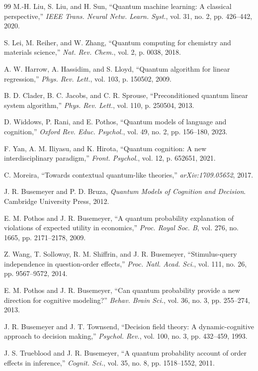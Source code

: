 \documentclass[journal]{IEEEtran}
\begin{document}
\begin{thebibliography}{99}
 M.-H. Liu, S. Liu, and H. Sun, ``Quantum machine learning: A classical perspective,'' \textit{IEEE Trans. Neural Netw. Learn. Syst.}, vol. 31, no. 2, pp. 426--442, 2020.

 S. Lei, M. Reiher, and W. Zhang, ``Quantum computing for chemistry and materials science,'' \textit{Nat. Rev. Chem.}, vol. 2, p. 0038, 2018.

 A. W. Harrow, A. Hassidim, and S. Lloyd, ``Quantum algorithm for linear regression,'' \textit{Phys. Rev. Lett.}, vol. 103, p. 150502, 2009.

 B. D. Clader, B. C. Jacobs, and C. R. Sprouse, ``Preconditioned quantum linear system algorithm,'' \textit{Phys. Rev. Lett.}, vol. 110, p. 250504, 2013.

 D. Widdows, P. Rani, and E. Pothos, ``Quantum models of language and cognition,'' \textit{Oxford Rev. Educ. Psychol.}, vol. 49, no. 2, pp. 156--180, 2023.

 F. Yan, A. M. Iliyasu, and K. Hirota, ``Quantum cognition: A new interdisciplinary paradigm,'' \textit{Front. Psychol.}, vol. 12, p. 652651, 2021.

 C. Moreira, ``Towards contextual quantum-like theories,'' \textit{arXiv:1709.05652}, 2017.

 J. R. Busemeyer and P. D. Bruza, \textit{Quantum Models of Cognition and Decision}. Cambridge University Press, 2012.

 E. M. Pothos and J. R. Busemeyer, ``A quantum probability explanation of violations of expected utility in economics,'' \textit{Proc. Royal Soc. B}, vol. 276, no. 1665, pp. 2171--2178, 2009.

 Z. Wang, T. Solloway, R. M. Shiffrin, and J. R. Busemeyer, ``Stimulus-query independence in question-order effects,'' \textit{Proc. Natl. Acad. Sci.}, vol. 111, no. 26, pp. 9567--9572, 2014.

 E. M. Pothos and J. R. Busemeyer, ``Can quantum probability provide a new direction for cognitive modeling?'' \textit{Behav. Brain Sci.}, vol. 36, no. 3, pp. 255--274, 2013.

 J. R. Busemeyer and J. T. Townsend, ``Decision field theory: A dynamic-cognitive approach to decision making,'' \textit{Psychol. Rev.}, vol. 100, no. 3, pp. 432--459, 1993.

 J. S. Trueblood and J. R. Busemeyer, ``A quantum probability account of order effects in inference,'' \textit{Cognit. Sci.}, vol. 35, no. 8, pp. 1518--1552, 2011.


\end{thebibliography}
\end{document}
